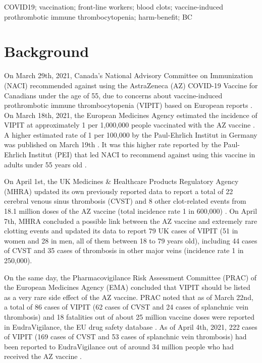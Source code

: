 \documentclass[]{interact}
\theoremstyle{plain}%
\theoremstyle{definition}
\theoremstyle{remark}
\begin{document}
\begin{keywords}
COVID19; vaccination; front-line workers; blood clots; vaccine-induced
prothrombotic immune thrombocytopenia; harm-benefit; BC
\end{keywords}

\hypertarget{background}{%
\section{Background}\label{background}}

On March 29th, 2021, Canada's National Advisory Committee on
Immunization (NACI) recommended against using the AstraZeneca (AZ)
COVID-19 Vaccine for Canadians under the age of 55, due to concerns
about vaccine-induced prothrombotic immune thrombocytopenia (VIPIT)
based on European reports
\citep{naci_naci_2021, greinacher_thrombotic_2021, schultz_thrombosis_2021}.
On March 18th, 2021, the European Medicines Agency estimated the
incidence of VIPIT at approximately 1 per 1,000,000 people vaccinated
with the AZ vaccine \citep{ema_covid-19_2021}. A higher estimated rate
of 1 per 100,000 by the Paul-Ehrlich Institut in Germany was published
on March 19th \citep{pei_covid-19_2021}. It was this higher rate
reported by the Paul-Ehrlich Institut (PEI) that led NACI to recommend
against using this vaccine in adults under 55 years old
\citep{naci_naci_2021}.

On April 1st, the UK Medicines \& Healthcare Products Regulatory Agency
(MHRA) updated its own previously reported data to report a total of 22
cerebral venous sinus thrombosis (CVST) and 8 other clot-related events
from 18.1 million doses of the AZ vaccine (total incidence rate 1 in
600,000) \citep{mhra_coronavirus_2021}. On April 7th, MHRA concluded a
possible link between the AZ vaccine and extremely rare clotting events
and updated its data to report 79 UK cases of VIPIT (51 in women and 28
in men, all of them between 18 to 79 years old), including 44 cases of
CVST and 35 cases of thrombosis in other major veins (incidence rate 1
in 250,000)\citep{mhra_mhra_2021}.

On the same day, the Pharmacovigilance Risk Assessment Committee (PRAC)
of the European Medicines Agency (EMA) concluded that VIPIT should be
listed as a very rare side effect of the AZ vaccine. PRAC noted that as
of March 22nd, a total of 86 cases of VIPIT (62 cases of CVST and 24
cases of splanchnic vein thrombosis) and 18 fatalities out of about 25
million vaccine doses were reported in EudraVigilance, the EU drug
safety database \citep{ema_astrazenecas_2021}. As of April 4th, 2021,
222 cases of VIPIT (169 cases of CVST and 53 cases of splanchnic vein
thrombosis) had been reported to EudraVigilance out of around 34 million
people who had received the AZ vaccine \citep{ema_astrazenecas_2021}.
\end{document}
